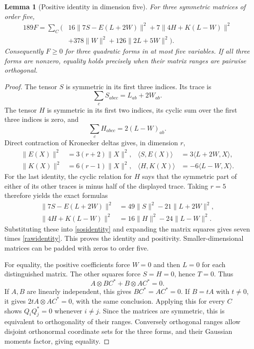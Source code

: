\documentclass[11pt]{article}
\newtheorem{lemma}[theorem]{Lemma}
\begin{document}
\begin{lemma}[Positive identity in dimension five]\label{sos}
For three symmetric matrices of order five,
\begin{align}\label{sosidentity}
189F=\sum_C\bigl(&16\|7S-E(L+2W)\|^2
             +7\|4H+K(L-W)\|^2\nonumber\\
             &+378\|W\|^2+126\|2L+5W\|^2\bigr).
\end{align}
Consequently $F\geq0$ for three quadratic forms in at most five variables.
If all three forms are nonzero, equality holds precisely when their matrix
ranges are pairwise orthogonal.
\end{lemma}
\begin{proof}
The tensor $S$ is symmetric in its first three indices. Its trace is
\[
 \sum_c S_{abcc}=L_{ab}+2W_{ab}.
\]
The tensor $H$ is symmetric in its first two indices, its cyclic sum over the
first three indices is zero, and
\[
 \sum_c H_{abcc}=2(L-W)_{ab}.
\]
Direct contraction of Kronecker deltas gives, in dimension $r$,
\begin{align*}
 \|E(X)\|^2&=3(r+2)\|X\|^2,&
 \langle S,E(X)\rangle&=3\langle L+2W,X\rangle,\\
 \|K(X)\|^2&=6(r-1)\|X\|^2,&
 \langle H,K(X)\rangle&=-6\langle L-W,X\rangle.
\end{align*}
For the last identity, the cyclic relation for $H$ says that the symmetric
part of either of its other traces is minus half of the displayed trace.
Taking $r=5$ therefore yields the exact formulas
\begin{align*}
 \|7S-E(L+2W)\|^2&=49\|S\|^2-21\|L+2W\|^2,\\
 \|4H+K(L-W)\|^2&=16\|H\|^2-24\|L-W\|^2.
\end{align*}
Substituting these into \eqref{sosidentity} and expanding the matrix squares
gives seven times \eqref{rawidentity}. This proves the identity and positivity.
Smaller-dimensional matrices can be padded with zeros to order five.

For equality, the positive coefficients force $W=0$ and then $L=0$ for
each distinguished matrix. The other squares force $S=H=0$, hence $T=0$.
Thus
\[
 A\otimes BC^*+B\otimes AC^*=0.
\]
If $A,B$ are linearly independent, this gives $BC^*=AC^*=0$. If $B=tA$
with $t\ne0$, it gives $2tA\otimes AC^*=0$, with the same conclusion.
Applying this for every $C$ shows $Q_iQ_j^*=0$ whenever $i\ne j$.
Since the matrices are symmetric, this is equivalent to orthogonality of
their ranges. Conversely orthogonal ranges allow disjoint orthonormal
coordinate sets for the three forms, and their Gaussian moments factor,
giving equality.
\end{proof}
\end{document}
